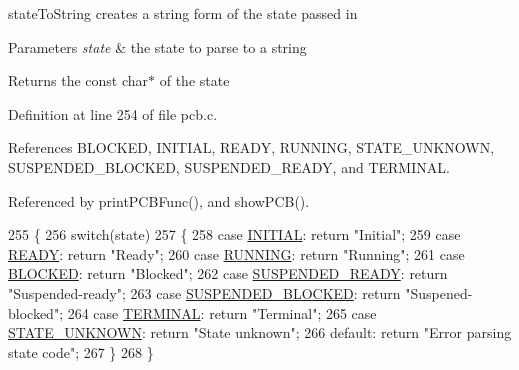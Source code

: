 state\+To\+String creates a string form of the state passed in 


\begin{DoxyParams}{Parameters}
{\em state} & the state to parse to a string \\
\hline
\end{DoxyParams}
\begin{DoxyReturn}{Returns}
the const char$\ast$ of the state 
\end{DoxyReturn}


Definition at line 254 of file pcb.\+c.



References B\+L\+O\+C\+K\+ED, I\+N\+I\+T\+I\+AL, R\+E\+A\+DY, R\+U\+N\+N\+I\+NG, S\+T\+A\+T\+E\+\_\+\+U\+N\+K\+N\+O\+WN, S\+U\+S\+P\+E\+N\+D\+E\+D\+\_\+\+B\+L\+O\+C\+K\+ED, S\+U\+S\+P\+E\+N\+D\+E\+D\+\_\+\+R\+E\+A\+DY, and T\+E\+R\+M\+I\+N\+AL.



Referenced by print\+P\+C\+B\+Func(), and show\+P\+C\+B().


\begin{DoxyCode}
255 \{
256     \textcolor{keywordflow}{switch}(state)
257     \{
258         \textcolor{keywordflow}{case} \hyperlink{pcb_8h_a8461d6c03c00b03bad59b5a29d27b902a7116db6906963fd0720c4a85be250cf4}{INITIAL}: \textcolor{keywordflow}{return} \textcolor{stringliteral}{"Initial"};
259         \textcolor{keywordflow}{case} \hyperlink{pcb_8h_a8461d6c03c00b03bad59b5a29d27b902a6564f2f3e15be06b670547bbcaaf0798}{READY}: \textcolor{keywordflow}{return} \textcolor{stringliteral}{"Ready"};
260         \textcolor{keywordflow}{case} \hyperlink{pcb_8h_a8461d6c03c00b03bad59b5a29d27b902a1061be6c3fb88d32829cba6f6b2be304}{RUNNING}: \textcolor{keywordflow}{return} \textcolor{stringliteral}{"Running"};
261         \textcolor{keywordflow}{case} \hyperlink{pcb_8h_a8461d6c03c00b03bad59b5a29d27b902a376c1b6a3f75d283a2efacf737438d61}{BLOCKED}: \textcolor{keywordflow}{return} \textcolor{stringliteral}{"Blocked"};
262         \textcolor{keywordflow}{case} \hyperlink{pcb_8h_a8461d6c03c00b03bad59b5a29d27b902a81cc2296827c731236176fea80701294}{SUSPENDED\_READY}: \textcolor{keywordflow}{return} \textcolor{stringliteral}{"Suspended-ready"};
263         \textcolor{keywordflow}{case} \hyperlink{pcb_8h_a8461d6c03c00b03bad59b5a29d27b902aa4d91165aaa967e74157a23c02725bc7}{SUSPENDED\_BLOCKED}: \textcolor{keywordflow}{return} \textcolor{stringliteral}{"Suspened-blocked"};
264         \textcolor{keywordflow}{case} \hyperlink{pcb_8h_a8461d6c03c00b03bad59b5a29d27b902a9b2989c4ac8a0f9a7f46528384eaa5c7}{TERMINAL}: \textcolor{keywordflow}{return} \textcolor{stringliteral}{"Terminal"};
265         \textcolor{keywordflow}{case} \hyperlink{pcb_8h_a8461d6c03c00b03bad59b5a29d27b902a786a8e9401b8091f65b2afbd342c90f5}{STATE\_UNKNOWN}: \textcolor{keywordflow}{return} \textcolor{stringliteral}{"State unknown"};
266         \textcolor{keywordflow}{default}: \textcolor{keywordflow}{return} \textcolor{stringliteral}{"Error parsing state code"};
267     \}
268 \}
\end{DoxyCode}

